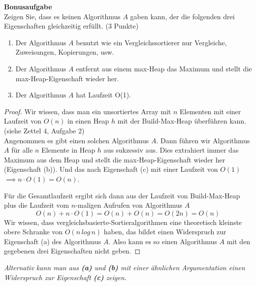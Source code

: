 \documentclass[ngerman,landscape,twocolumn]{adtexsheet}
\begin{document}
\begin{question}
    \textbf{Bonusaufgabe}\\
    Zeigen Sie, dass es keinen Algorithmus $A$ gaben kann, der die folgenden drei Eigenschaften gleichzeitig erfüllt. (3 Punkte)
    \begin{enumerate}
        \item Der Algorithmus $A$ benutzt wie ein Vergleichssortierer nur Vergleiche, Zuweisungen, Kopierungen, usw.
        \item Der Algorithmus $A$ entfernt aus einem max-Heap das Maximum und stellt die         max-Heap-Eigenschaft wieder her.
        \item Der Algorithmus $A$ hat Laufzeit O(1).
    \end{enumerate}
\end{question}

\begin{proof}
    Wir wissen, dass man ein unsortiertes Array mit $n$  Elementen mit einer Laufzeit von $O(n)$ in einen Heap $h$ mit der Build-Max-Heap überführen kann. (siehe Zettel 4, Aufgabe 2)\\
    Angenommen es gibt einen solchen Algorithmus $A$. Dann führen wir Algorithmus $A$ für alle $n$ Elemente in Heap $h$ aus sukzessiv aus. Dies extrahiert immer das Maximum aus dem Heap und stellt die max-Heap-Eigenschaft wieder her (Eigenschaft (b)). Und das nach Eigenschaft (c) mit einer Laufzeit von $O(1)$ $\implies n \cdot O(1) = O(n)$.
    
    Für die Gesamtlaufzeit ergibt sich dann aus der Laufzeit von Build-Max-Heap plus die Laufzeit vom $n$-maligen Aufrufen von Algorithmus $A$ 
\[
O(n) + n \cdot O(1) = O(n) +O(n) = O(2n) = O(n)
\]    
    Wir wissen, dass vergleichsbasierte-Sortieralgorithmen eine theoretisch kleinste obere Schranke von $O(n\,log\,n)$ haben, das bildet einen Widerspruch zur Eigenschaft (a) des Algorithmus $A$. Also kann es so einen Algorithmus $A$ mit den gegebenen drei Eigenschaften nicht geben.
\end{proof}

\textit{Alternativ kann man aus \textbf{(a)} und \textbf{(b)} mit einer ähnlichen Argumentation einen Widerspruch zur Eigenschaft \textbf{(c)} zeigen.}
\end{document}
